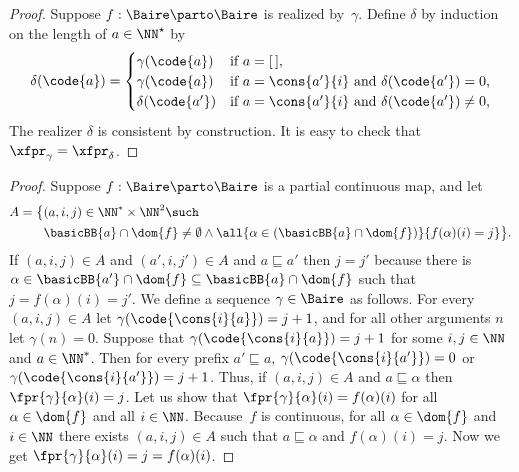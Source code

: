 \begin{proof}
  Suppose $f : \Baire \parto \Baire$ is realized by~$\gamma$. Define
  $\delta$ by induction on the length of $a \in \NN^{\star}$ by
  \begin{equation*}
    \delta(\code{a}) =
    \begin{cases}
      \gamma(\code{a}) & \text{if $a = [\,]$,}\\
      \gamma(\code{a}) & \text{if $a = \cons{a'}{i}$ and
        $\delta(\code{a'}) = 0$,}\\
      \delta(\code{a'}) & \text{if $a = \cons{a'}{i}$ and
        $\delta(\code{a'}) \neq 0$,}
    \end{cases}
  \end{equation*}
  The realizer $\delta$ is consistent by construction. It is easy to check that $\xfpr_\gamma = \xfpr_\delta$.
\end{proof}


\begin{proof}
  Suppose $f: \Baire \parto \Baire$ is a partial continuous map, and let
  \begin{align*}
     A = \big\{ & (a, i, j) \in \NN^{*} \times \NN^{2} \such \\
       &\basicBB{a} \cap \dom{f} \neq \emptyset \land
        \all{\alpha \in (\basicBB{a} \cap \dom{f})}{
          f(\alpha)(i) = j
          }
        \big\}.
  \end{align*}
  If $(a, i, j) \in A$ and $(a', i, j') \in A$ and $a \sqsubseteq a'$
  then $j = j'$ because there is $\alpha \in \basicBB{a'} \cap
  \dom{f} \subseteq \basicBB{a} \cap \dom{f}$ such that $j =
  f(\alpha)(i) = j'$. We define a sequence $\gamma \in \Baire$ as
  follows. For every $(a, i, j) \in A$ let
  $\gamma(\code{\cons{i}{a}}) = j + 1$, and for all other
  arguments $n$ let $\gamma(n) = 0$. Suppose that
  $\gamma(\code{\cons{i}{a}}) = j + 1$ for some $i, j \in \NN$
  and $a \in \NN^{*}$. Then for every prefix $a' \sqsubseteq a$,
  $\gamma(\code{\cons{i}{a'}}) = 0$ or
  $\gamma(\code{\cons{i}{a'}}) = j + 1$. Thus, if $(a, i, j) \in
  A$ and $a \sqsubseteq \alpha$ then $\fpr{\gamma}{\alpha}(i) = j$.
  Let us show that $\fpr{\gamma}{\alpha}(i) = f(\alpha)(i)$ for all
  $\alpha \in \dom{f}$ and all $i \in \NN$. Because~$f$ is continuous,
  for all $\alpha \in \dom{f}$ and $i \in \NN$ there exists $(a, i, j)
  \in A$ such that $a \sqsubseteq \alpha$ and $f(\alpha)(i) = j$. Now
  we get
  $
    \fpr{\gamma}{\alpha}(i)
    = j
    = f(\alpha)(i)
  $.
\end{proof}

